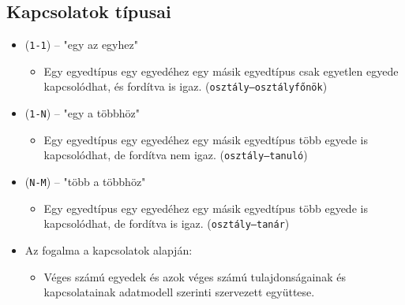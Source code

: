 \documentclass[../../main.tex]{subfiles}
\begin{document}
\subsection{Kapcsolatok típusai}

\begin{itemize}
  \item (\texttt{1-1}) – "{egy az egyhez}"
        \begin{itemize}
          \item Egy egyedtípus egy egyedéhez egy másik
                egyedtípus csak egyetlen egyede kapcsolódhat,
                és fordítva is igaz.
                (\texttt{osztály–osztályfőnök})
        \end{itemize}

  \item (\texttt{1-N}) – "{egy a többhöz}"
        \begin{itemize}
          \item Egy egyedtípus egy egyedéhez egy másik
                egyedtípus több egyede is kapcsolódhat,
                de fordítva nem igaz.
                (\texttt{osztály–tanuló})
        \end{itemize}

  \item (\texttt{N-M}) – "{több a többhöz}"
        \begin{itemize}
          \item Egy egyedtípus egy egyedéhez egy másik
                egyedtípus több egyede is kapcsolódhat,
                de fordítva is igaz.
                (\texttt{osztály–tanár})
        \end{itemize}

  \item Az  fogalma a kapcsolatok alapján:
        \begin{itemize}
          \item Véges számú egyedek és azok véges számú tulajdonságainak
                és kapcsolatainak adatmodell szerinti szervezett együttese.
        \end{itemize}


\end{itemize}
\end{document}
